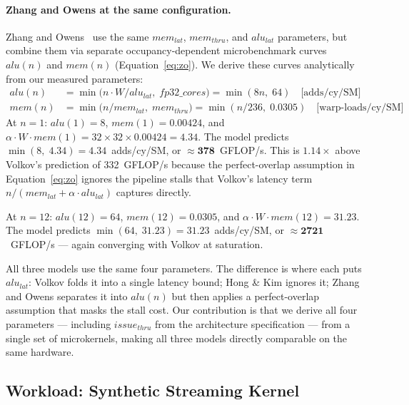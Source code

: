 \paragraph{Zhang and Owens at the same configuration.}
Zhang and Owens~\cite{zhang2011quantitative} use the same $mem_{lat}$,
$mem_{thru}$, and $alu_{lat}$ parameters, but combine them via separate
occupancy-dependent microbenchmark curves $\mathit{alu}(n)$ and
$\mathit{mem}(n)$ (Equation~\ref{eq:zo}).
We derive these curves analytically from our measured parameters:
%
\begin{align*}
  \mathit{alu}(n) &= \min\!\bigl(n \cdot W / alu_{lat},\; \mathit{fp32\_cores}\bigr)
                   = \min(8n,\; 64) \quad \text{[adds/cy/SM]} \\
  \mathit{mem}(n) &= \min\!\bigl(n / mem_{lat},\; mem_{thru}\bigr)
                   = \min(n/236,\; 0.0305) \quad \text{[warp-loads/cy/SM]}
\end{align*}
%
At $n = 1$: $\mathit{alu}(1) = 8$, $\mathit{mem}(1) = 0.00424$, and
$\alpha \cdot W \cdot \mathit{mem}(1) = 32 \times 32 \times 0.00424 = 4.34$.
The model predicts $\min(8,\; 4.34) = 4.34$~adds/cy/SM,
or $\approx \mathbf{378}$~GFLOP/s.
This is $1.14\times$ above Volkov's prediction of 332~GFLOP/s because
the perfect-overlap assumption in Equation~\ref{eq:zo} ignores the pipeline
stalls that Volkov's latency term $n/(mem_{lat} + \alpha \cdot alu_{lat})$
captures directly.

At $n = 12$: $\mathit{alu}(12) = 64$, $\mathit{mem}(12) = 0.0305$, and
$\alpha \cdot W \cdot \mathit{mem}(12) = 31.23$.
The model predicts $\min(64,\; 31.23) = 31.23$~adds/cy/SM,
or $\approx \mathbf{2721}$~GFLOP/s --- again converging with Volkov at saturation.

All three models use the same four parameters.
The difference is where each puts $alu_{lat}$:
Volkov folds it into a single latency bound;
Hong \& Kim ignores it;
Zhang and Owens separates it into $\mathit{alu}(n)$ but then applies a
perfect-overlap assumption that masks the stall cost.
Our contribution is that we derive all four parameters --- including
$issue_{thru}$ from the architecture specification --- from a single
set of microkernels, making all three models directly comparable on the same hardware.




\subsection{Workload: Synthetic Streaming Kernel}
\label{subsec:synthetic_kernel}


